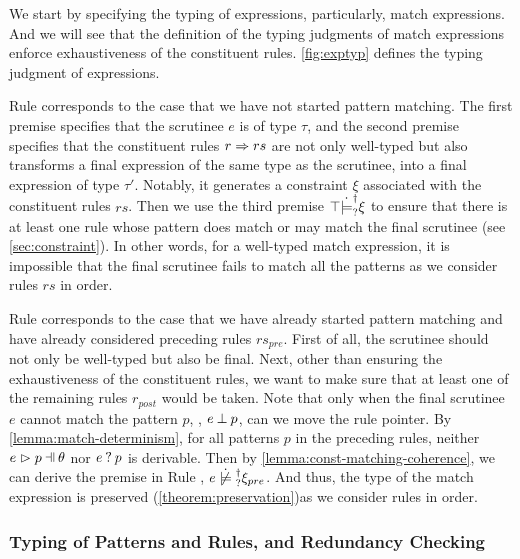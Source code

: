 We start by specifying the typing of expressions, particularly, match
expressions. And we will see that the definition of the typing judgments of
match expressions enforce exhaustiveness of the constituent rules.
\autoref{fig:exptyp} defines the typing judgment of expressions.


Rule \TMatchZPre corresponds to the case that we have not started pattern
matching. The first premise specifies that the scrutinee $e$ is of type $\tau$,
and the second premise specifies that the constituent rules $r \Rightarrow rs$ are not only
well-typed but also transforms a final expression of the same type as the
scrutinee, into a final expression of type $\tau'$. Notably, it generates a
constraint $\xi$ associated with the constituent rules $rs$. Then we use the
third premise $\top \dot{\models}_{?}^{\dag} \xi$ to ensure that there is at least
one rule whose pattern does match or may match the final scrutinee (see
\autoref{sec:constraint}). In other words, for a well-typed match expression,
it is impossible that the final scrutinee fails to match all the patterns as we
consider rules $rs$ in order.

Rule \TMatchNZPre corresponds to the case that we have already started pattern
matching and have already considered preceding rules $rs_{pre}$. First of all,
the scrutinee should not only be well-typed but also be final. Next, other than
ensuring the exhaustiveness of the constituent rules, we want to make sure that
at least one of the remaining rules $r_{post}$ would be taken. Note
that only when the final scrutinee $e$ cannot match the pattern $p$, \ie,
$e \mathbin{\bot} p$, can we move the rule pointer. By
\autoref{lemma:match-determinism}, for all patterns $p$ in the preceding
rules, neither $\hpatmatch{e}{p}{\theta}$ nor $e \mathbin{?} p$ is derivable.
Then by \autoref{lemma:const-matching-coherence}, we can derive the premise
in Rule \TMatchNZPre, $\cnotsatisfyormay{e}{\xi_{pre}}$. And thus, the type of
the match expression is preserved (\autoref{theorem:preservation})as we consider rules in order.

\subsubsection{Typing of Patterns and Rules, and Redundancy Checking}
\label{sec:pattyp}

